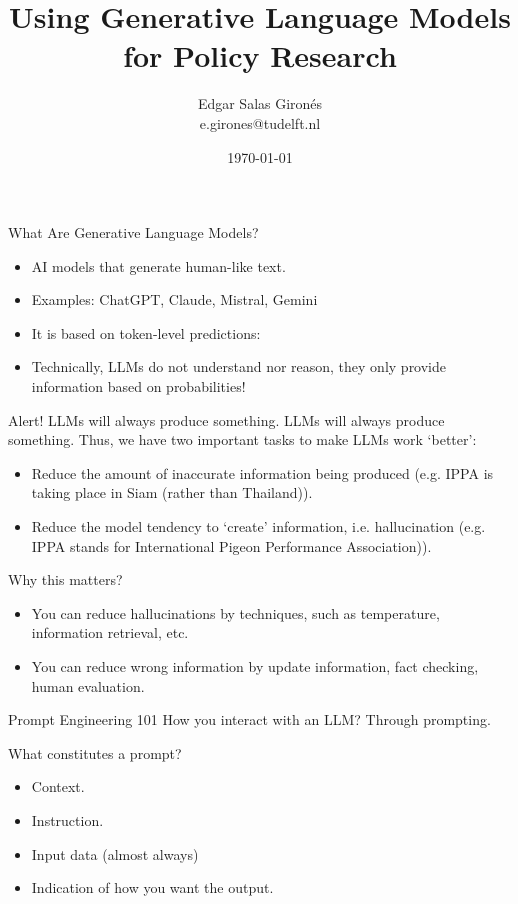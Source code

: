 \documentclass{beamer}
\title{Using Generative Language Models for Policy Research}
\author[E. Salas Gironés]{Edgar Salas Gironés \\ e.girones@tudelft.nl}
\date{\today}
\begin{document}
\begin{frame}
  \titlepage
\end{frame}

\begin{frame}{What Are Generative Language Models?}
\begin{itemize}
    \item AI models that generate human-like text.
    \item Examples: ChatGPT, Claude, Mistral, Gemini
    \item It is based on token-level predictions:
    \item Technically, LLMs do not understand nor reason, they only provide information based on probabilities!
\end{itemize}
\end{frame}

\begin{frame}{Alert! LLMs will always produce something.}
    LLMs will always produce something. Thus, we have two important tasks to make LLMs work `better':
    \begin{itemize}
        \item Reduce the amount of inaccurate information being produced (e.g. IPPA is taking place in Siam (rather than Thailand)).
        \item Reduce the model tendency to `create' information, i.e. hallucination (e.g. IPPA stands for International Pigeon Performance Association)).
    \end{itemize}
\end{frame}

\begin{frame}{Why this matters?}
    \begin{itemize}
        \item You can reduce hallucinations by techniques, such as temperature, information retrieval, etc.
        \item You can reduce wrong information by update information, fact checking, human evaluation. 
    \end{itemize}
\end{frame}

\begin{frame}{Prompt Engineering 101}
    How you interact with an LLM? Through prompting. 

    \vspace{0.5cm}
    What constitutes a prompt?
    \begin{itemize}
        \item Context.
        \item Instruction.
        \item Input data (almost always)
        \item Indication of how you want the output.
    \end{itemize}
\end{frame}
\end{document}
